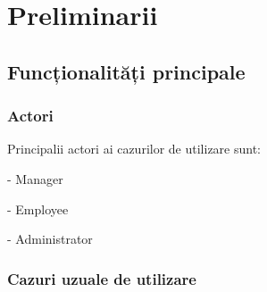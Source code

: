 \chapter{Preliminarii}

\section{Funcționalități principale}
\subsection{Actori}
Principalii actori ai cazurilor de utilizare sunt: 

- Manager

- Employee

- Administrator

\subsection{Cazuri uzuale de utilizare}
